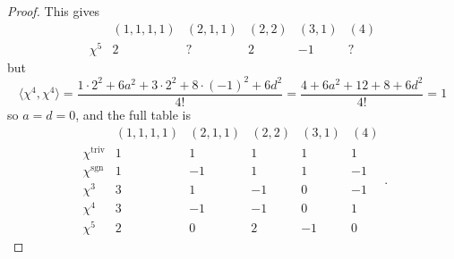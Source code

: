 \documentclass{article}
\newcommand{\ang}[1]{\langle #1 \rangle}
\begin{document}
\begin{proof}
  This gives \[
    \begin{array}{ l|rrrrr }
            & (1,1,1,1) & (2,1,1) & (2,2) & (3,1) & (4) \\ \hline
     \chi^5 & 2 & ? & 2 &  -1 & ?
   \end{array}
  \] but \[
    \ang{\chi^4,\chi^4} = \frac{
      1 \cdot 2^2 +
      6a^2 +
      3 \cdot 2^2 +
      8 \cdot (-1)^2 +
      6d^2
    }{4!}
    = \frac{
      4 +
      6a^2 +
      12 +
      8 +
      6d^2
    }{4!}
    = 1
  \] so $a = d = 0$, and the full table is \[
    \begin{array}{ l|rrrrr }
                        & (1,1,1,1) & (2,1,1) & (2,2) & (3,1) & (4) \\
       \hline
       \chi^\text{triv} & 1 &  1 & 1 &  1 &  1 \\
       \chi^\text{sgn}  & 1 & -1 & 1 &  1 & -1 \\
       \chi^3           & 3 & 1 & -1 &  0 & -1 \\
       \chi^4           & 3 & -1 & -1 &  0 & 1 \\
       \chi^5           & 2 & 0 & 2 &  -1 & 0
     \end{array}.
   \]
\end{proof}
\end{document}
